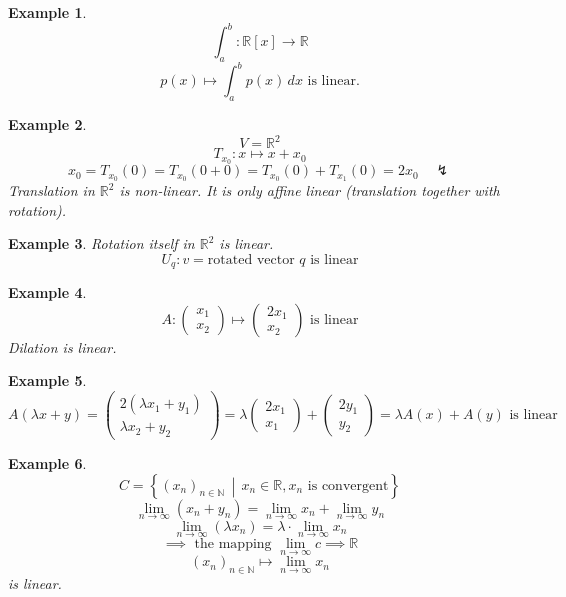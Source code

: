\documentclass[a4paper,landscape,twocolumn]{article}
\newcommand\setdef[2]{\left\{#1\,\middle|\,#2\right\}}
\newtheorem{ex}{Example}[section]
\begin{document}
\begin{ex}
  \[ \int_a^b: \mathbb R[x] \rightarrow \mathbb R \]
  \[ p(x) \mapsto \int_a^b p(x) \,dx \text{ is linear.} \]
\end{ex}

\begin{ex}
  \[ V = \mathbb R^2 \]
  \[ T_{x_0}: x \mapsto x + x_0 \]
  \[ x_0 = T_{x_0}(0) = T_{x_0}(0 + 0) = T_{x_0}(0) + T_{x_1}(0) = 2 x_0 \quad\lightning \]
  Translation in $\mathbb R^2$ is non-linear.
  It is only \emph{affine linear} (translation together with rotation).
\end{ex}

\begin{ex}
  Rotation itself in $\mathbb R^2$ is linear.
  \[ U_q: v = \text{rotated vector $q$ is linear} \]
\end{ex}

\begin{ex}
  \[
    A: \begin{pmatrix} x_1 \\ x_2 \end{pmatrix} \mapsto \begin{pmatrix} 2x_1 \\ x_2 \end{pmatrix}
    \text{ is linear}
  \]
  Dilation is linear.
\end{ex}

\begin{ex}
  \[
    A(\lambda x + y)
    = \begin{pmatrix} 2 (\lambda x_1 + y_1) \\ \lambda x_2 + y_2 \end{pmatrix}
    = \lambda \begin{pmatrix} 2 x_1 \\ x_1 \end{pmatrix} + \begin{pmatrix} 2 y_1 \\ y_2 \end{pmatrix}
    = \lambda A(x) + A(y)
    \text{ is linear}
  \]
\end{ex}

\begin{ex}
  \[ C = \setdef{(x_n)_{n\in\mathbb N}}{x_n \in \mathbb R, x_n \text{ is convergent}} \]
  \[ \lim_{n\to\infty} (x_n + y_n) = \lim_{n\to\infty} x_n + \lim_{n\to\infty} y_n \]
  \[ \lim_{n\to\infty} (\lambda x_n) = \lambda \cdot \lim_{n\to\infty} x_n \]
  \[ \implies \text{ the mapping } \lim_{n\to\infty} c \implies \mathbb R \]
  \[ (x_n)_{n\in\mathbb N} \mapsto \lim_{n\to\infty} x_n\]
  is linear.
\end{ex}
\end{document}
